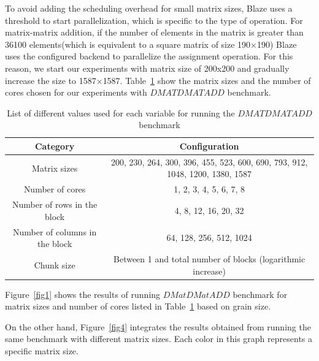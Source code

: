 To avoid adding the scheduling overhead for small matrix sizes, Blaze uses a threshold to start parallelization, which is specific to the type of operation. For matrix-matrix addition, if the number of elements in the matrix is greater than 36100 elements(which is equivalent to a square matrix of size 190$\times$190) Blaze uses the configured backend to parallelize the assignment operation. For this reason, we start our experiments with matrix size of 200x200 and gradually increase the size to 1587$\times$1587. 
Table~\ref{table1} show the matrix sizes and the number of cores chosen for our experiments with $DMATDMATADD$ benchmark.

\vspace{\baselineskip}	
\begin{table}[H]
	\centering
		\resizebox{\textwidth}{!}
		{\begin{tabular}{|c | c |} 
			\hline
			Category & Configuration \\
			\hline
			\hline
			Matrix sizes & 200, 230, 264, 300, 396, 455, 523, 600, 690, 793, 912, 1048, 1200, 1380, 1587 \\ [0.5ex] 
			\hline
			Number of cores & 1, 2, 3, 4, 5, 6, 7, 8 \\ 	
			\hline
			Number of rows in the block & 4, 8, 12, 16, 20, 32 \\
			\hline	
			Number of columns in the block & 64, 128, 256, 512, 1024 \\
			\hline
			Chunk size & Between 1 and total number of blocks (logarithmic increase)\\\hline
		\end{tabular}}

		\caption{List of different values used for each variable for running the $DMATDMATADD$ benchmark}
		\label{table1}
\end{table}

\vspace{\baselineskip}	
Figure~\ref{fig1} shows the results of running $DMatDMatADD$ benchmark for matrix sizes and number of cores listed in Table~\ref{table1} based on grain size. 

On the other hand, Figure~\ref{fig4} integrates the results obtained from running the same benchmark with different matrix sizes. Each color in this graph represents a specific matrix size. 

